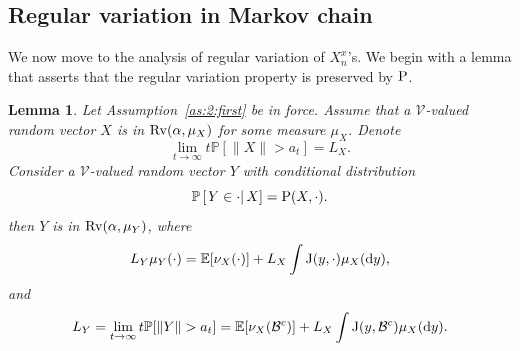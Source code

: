 \documentclass[preprint,12pt]{elsarticle}
\newtheorem{lem}[thm]{Lemma}
\theoremstyle{definition}
\theoremstyle{remark}
\newcommand{\Xbf}{{ X}}
\newcommand{\Ybf}{{ Y}}
\newcommand{\bfy}{{ y}}
\newcommand{\1}{{\mathbf 1}}
\numberwithin{equation}{section}
\newcommand{\Ebb}{\mathbb{E}}  %
\newcommand{\Pbb}{\mathbb{P}}
\newcommand{\ud}{{\rm d}}
\newcommand{\Prm}{{\rm P}}
\newcommand{\Krm}{{\rm J}}
\newcommand{\Rvrm}{{\rm Rv}}
\newcommand{\Vcal}{\mathcal{V}}
\newcommand{\Bcal}{\mathcal{B}}
\begin{document}
\subsection{Regular variation in Markov chain}

  We now move to the analysis of regular variation of $X_n^x$'s. We begin with a lemma that asserts
  that the regular variation property is preserved by $\Prm$.

  \begin{lem}\label{lem:3:key}
    Let Assumption~\ref{as:2:first} be in force.
    Assume that a $\Vcal$-valued random vector 
    $\Xbf$ is in $\Rvrm(\alpha, \mu_\Xbf)$ for some measure $\mu_\Xbf$. 
    Denote  
    \begin{equation*}
      \lim_{t \to \infty} t \Pbb[\|\Xbf\| > a_t] = L_\Xbf.  
    \end{equation*}  
    Consider a $\Vcal$-valued random vector $\Ybf$ with conditional distribution
    \begin{equation*}  
      \Pbb\left[ \left. \Ybf \in \cdot \right| \Xbf \right] = \Prm(\Xbf, \cdot).
    \end{equation*}  
    then $\Ybf$ is in $\Rvrm(\alpha, \mu_\Ybf)$, where  
    \begin{equation*}  
      L_\Ybf \mu_\Ybf(\cdot) = 
      \Ebb[\nu_{\Xbf}(\cdot)] + L_\Xbf \int \Krm(\bfy,\cdot) \mu_\Xbf(\ud \bfy),  
    \end{equation*}  
    and  
    \begin{equation*}  
      L_\Ybf = \lim_{t \to \infty} t \Pbb[\|\Ybf\| > a_t] =  
      \Ebb[\nu_{\Xbf}(\Bcal^c)] + L_\Xbf \int \Krm(\bfy, \mathcal{B}^c) \mu_\Xbf(\ud \bfy).  
    \end{equation*}
  \end{lem}
\end{document}
